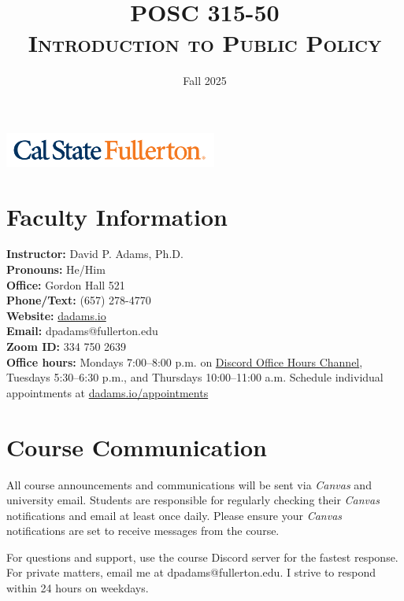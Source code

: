 \documentclass[12pt]{article}     %
\title{\textbf{POSC 315-50} \\ \textsc{Introduction to Public Policy}} %
\author{}                         %
\date{Fall 2025}                  %
\begin{document}
\maketitle

\begin{center}
    \includegraphics[width=2.75in, alt={Cal State Fullerton wordmark}]{csuf_logo.png}
\end{center}


\section{Faculty Information}
\noindent \textbf{Instructor:} David P. Adams, Ph.D. \\
\noindent \textbf{Pronouns:} He/Him \\
\noindent \textbf{Office:} Gordon Hall 521 \\
\noindent \textbf{Phone/Text:} (657) 278-4770 \\
\noindent \textbf{Website:} \href{https://dadams.io}{dadams.io} \\
\noindent \textbf{Email:} dpadams@fullerton.edu \\
\noindent \textbf{Zoom ID:} 334 750 2639 \\
\noindent \textbf{Office hours:} Mondays 7:00--8:00 p.m. on \href{https://discord.com/channels/1128747433636135113/1154048074172354600}{Discord Office Hours Channel}, Tuesdays 5:30--6:30 p.m., and Thursdays 10:00--11:00 a.m. Schedule individual appointments at \href{https://dadams.io/appointments}{dadams.io/appointments}

\section{Course Communication}
All course announcements and communications will be sent via \emph{Canvas} and university email. Students are responsible for regularly checking their \emph{Canvas} notifications and email at least once daily. Please ensure your \emph{Canvas} notifications are set to receive messages from the course.

For questions and support, use the course Discord server for the fastest response. For private matters, email me at dpadams@fullerton.edu. I strive to respond within 24 hours on weekdays.
\end{document}
